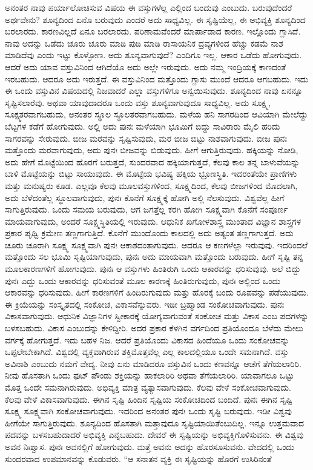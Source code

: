 ಅನಂತರ ನಾವು ಪರ್ಯಾಲೋಚಿಸುವ ವಿಷಯ ಈ ವಸ್ತುಗಳೆಲ್ಲ ಎಲ್ಲಿಂದ ಬಂದುವು ಎಂಬುದು. ಬರುವುದೆಂದರೆ ಅರ್ಥವೇನು? ಶೂನ್ಯದಿಂದ ಏನೊ ಬರುವುದು ಎಂದರೆ ಅದು ಸಾಧ್ಯವಿಲ್ಲ. ಈ ಸೃಷ್ಟಿಯೆಲ್ಲ, ಈ ಅಭಿವ್ಯಕ್ತಿ ಶೂನ್ಯದಿಂದ ಬರಲಾರದು. ಕಾರಣವಿಲ್ಲದೆ ಏನೂ ಬರಲಾರದು. ಪರಿಣಾಮವೆಂದರೆ ಮಾರ್ಪಾಡಾದ ಕಾರಣ. ಇಲ್ಲೊಂದು ಗ್ಲಾಸಿದೆ. ನಾವು ಅದನ್ನು ಒಡೆದು ಚೂರು ಚೂರು ಮಾಡಿ ಪುಡಿ ಮಾಡಿ ರಾಸಾಯನಿಕ ದ್ರವ್ಯಗಳಿಂದ ಹೆಚ್ಚು ಕಡಮೆ ನಾಶ ಮಾಡಿದೆವು ಎಂದು ಇಟ್ಟು ಕೊಳ್ಳೋಣ. ಅದು ಶೂನ್ಯವಾಗುವುದೆ? ಎಂದಿಗೂ ಇಲ್ಲ. ಆಕಾರ ಒಡೆದು ಹೋಗುವುದು. ಆದರೆ ಅದು ಯಾವ ವಸ್ತುವಿನಿಂದ ಆಗಿದೆಯೊ ಅದು ಅಲ್ಲೇ ಇರುವುದು. ಅದು ನಮ್ಮ ಇಂದ್ರಿಯಕ್ಕೆ ಕಾಣದಂತೆ ಇರಬಹುದು. ಆದರೂ ಅದು ಇರುತ್ತದೆ. ಈ ವಸ್ತುವಿನಿಂದ ಮತ್ತೊಂದು ಗ್ಲಾಸು ಮುಂದೆ ಆದರೂ ಆಗಬಹುದು. ಇದು ಈ ಒಂದು ವಸ್ತುವಿನ ವಿಷಯದಲ್ಲಿ ನಿಜವಾದರೆ ಎಲ್ಲಾ ವಸ್ತುಗಳಿಗೂ ಅನ್ವಯಿಸುವುದು. ಶೂನ್ಯದಿಂದ ನಾವು ಏನನ್ನೂ ಸೃಷ್ಟಿಸಲಾರೆವು. ಅಥವಾ ಯಾವುದಾದರೂ ಒಂದು ವಸ್ತು ಶೂನ್ಯವಾಗುವುದೂ ಸಾಧ್ಯವಿಲ್ಲ. ಅದು ಸೂಕ್ಷ್ಮ, ಸೂಕ್ಷ್ಮತರವಾಗಬಹುದು, ಅನಂತರ ಸ್ಥೂಲ ಸ್ಥೂಲತರವಾಗಬಹುದು. ಮಳೆಯ ಹನಿ ಸಾಗರದಿಂದ ಆವಿಯಾಗಿ ಮೇಲೆದ್ದು ಬೆಟ್ಟಗಳ ಕಡೆಗೆ ಹೋಗುವುದು. ಅಲ್ಲಿ ಅದು ಪುನಃ ಮಳೆಯಾಗಿ ಭೂಮಿಗೆ ಬಿದ್ದು ಸಾವಿರಾರು ಮೈಲಿ ಹರಿದು ಸಾಗರವನ್ನು ಸೇರುವುದು. ಬೀಜ ಮರವನ್ನು ಸೃಷ್ಟಿಸುವುದು, ಮರ ಬೀಜ ಬಿಟ್ಟು ನಾಶವಾಗುವುದು. ಬೀಜ ಪುನಃ ಮತ್ತೊಂದು ಮರವಾಗುವುದು, ಅದು ಪುನಃ ಬೀಜವನ್ನು ಬಿಡುವುದು. ಹೀಗೆ ಆಗುತ್ತಿರುವುದು. ಹಕ್ಕಿಯನ್ನು ನೋಡಿ, ಅದು ಹೇಗೆ ಮೊಟ್ಟೆಯಿಂದ ಹೊರಗೆ ಬರುತ್ತದೆ, ಸುಂದರವಾದ ಹಕ್ಕಿಯಾಗುತ್ತದೆ, ಕೆಲವು ಕಾಲ ತನ್ನ ಬಾಳುವೆಯನ್ನು ಬಾಳಿ ಮೊಟ್ಟೆಯನ್ನು ಬಿಟ್ಟು ಸಾಯುವುದು. ಈ ಮೊಟ್ಟೆಯ ಭವಿಷ್ಯ ಹಕ್ಕಿಯ ಭ್ರೂಣಸ್ಥಿತಿ. ಇದರಂತೆಯೇ ಪ್ರಾಣಿಗಳು ಮತ್ತು ಮನುಷ್ಯರು ಕೂಡ. ಎಲ್ಲವೂ ಕೆಲವು ಮೂಲವಸ್ತುಗಳಿಂದ, ಸೂಕ್ಷ್ಮದಿಂದ, ಕೆಲವು ಬೀಜಗಳಿಂದ ಮೊದಲಾಗಿ, ಅದು ಬೆಳೆದಂತೆಲ್ಲ ಸ್ಥೂಲವಾಗುವುದು, ಪುನಃ ಕೊನೆಗೆ ಸೂಕ್ಷ್ಮಕ್ಕೆ ಹೋಗಿ ಅಲ್ಲಿ ನೆಲಸುವುದು. ವಿಶ್ವವೆಲ್ಲ ಹೀಗೆ ಸಾಗುತ್ತಿರುವುದು. ಒಂದು ಸಮಯ ಬರುವುದು, ಆಗ ಜಗತ್ತೆಲ್ಲ ಕರಗಿ ಹೋಗಿ ಸೂಕ್ಷ್ಮವಾಗಿ ಕೊನೆಗೆ ಸಂಪೂರ್ಣ ಮಾಯವಾಗುವುದು, ಅಂದರೆ ಸೂಕ್ಷ್ಮಸ್ಥಿತಿಯಲ್ಲಿ ಇರುವುದು. ಆಧುನಿಕ ಖಗೋಳಶಾಸ್ತ್ರ ಮುಂತಾದ ವಿಜ್ಞಾನ ಶಾಸ್ತ್ರಗಳ ಪ್ರಕಾರ ಪೃಥ್ವಿ ಕ್ರಮೇಣ ತಣ್ಣಗಾಗುತ್ತಿದೆ. ಕೊನೆಗೆ ಮುಂದೊಂದು ಕಾಲದಲ್ಲಿ ಅದು ಅತ್ಯಂತ ತಣ್ಣಗಾಗುತ್ತದೆ. ಅದು ಚೂರು ಚೂರಾಗಿ ಸೂಕ್ಷ್ಮ ಸೂಕ್ಷ್ಮವಾಗಿ ಪುನಃ ಆಕಾಶದಂತಾಗುವುದು. ಆದರೂ ಆ ಕಣಗಳೆಲ್ಲಾ ಇರುವುವು. ಇದರಿಂದಲೆ ಮತ್ತೊಂದು ಸಲ ಭೂಮಿ ಸೃಷ್ಟಿಯಾಗುವುದು, ಪುನಃ ಅದು ಮಾಯವಾಗಿ ಮತ್ತೊಂದು ಬರುವುದು. ಹೀಗೆ ಸೃಷ್ಟಿ ತನ್ನ ಮೂಲಕಾರಣಗಳಿಗೆ ಹೋಗುವುದು. ಪುನಃ ಆ ವಸ್ತುಗಳು ಹಿಂತಿರುಗಿ ಒಂದು ಆಕಾರವನ್ನು ಧರಿಸುವುವು. ಅಲೆ ಬಿದ್ದು ಪುನಃ ಎದ್ದು ಒಂದು ಆಕಾರವನ್ನು ಧರಿಸುವಂತೆ ಮೂಲ ಕಾರಣಕ್ಕೆ ಹಿಂತಿರುಗುವುದು, ಪುನಃ ಅಲ್ಲಿಂದ ಒಂದು ಆಕಾರವನ್ನು ಧರಿಸುವುದು. ಹೀಗೆ ಕಾರಣಗಳಿಗೆ ಹಿಂದಿರುಗುವುದು ಮತ್ತು ಹೊರಕ್ಕೆ ಬಂದು ರೂಪವನ್ನು ಪಡೆಯುವುದು. ಈ ಕ್ರಿಯೆಯನ್ನು ಸಂಸ್ಕೃತದಲ್ಲಿ ಸಂಕೋಚ, ವಿಕಾಸವೆನ್ನುವರು. ಇಡೀ ಬ್ರಹ್ಮಾಂಡ ಸಂಕೋಚವಾಗುವುದು. ಪುನಃ ವಿಕಾಸವಾಗುವುದು. ಆಧುನಿಕ ವಿಜ್ಞಾನಿಗಳ ಸ್ವೀಕಾರಕ್ಕೆ ಯೋಗ್ಯವಾಗುವಂತೆ ಸಂಕೋಚ ಮತ್ತು ವಿಕಾಸ ಎಂಬ ಪದಗಳನ್ನು ಬಳಸಬಹುದು. ವಿಕಾಸ ಎಂಬುದನ್ನು ಕೇಳಿದ್ದೀರಿ. ಅದರ ಪ್ರಕಾರ ಕೆಳಗಿನ ವರ್ಗದಿಂದ ಪ್ರತಿಯೊಂದೂ ಬೆಳೆದು ಮೇಲು ವರ್ಗಕ್ಕೆ ಹೋಗುತ್ತದೆ. ಇದು ಬಹಳ ನಿಜ. ಆದರೆ ಪ್ರತಿಯೊಂದು ವಿಕಾಸದ ಹಿಂದೆಯೂ ಒಂದು ಸಂಕೋಚವನ್ನು ಒಪ್ಪಲೇಬೇಕಾಗಿದೆ. ವಿಶ್ವದಲ್ಲಿ ವ್ಯಕ್ತವಾಗಿರುವ ಶಕ್ತಿಮೊತ್ತವೆಲ್ಲ ಎಲ್ಲ ಕಾಲದಲ್ಲಿಯೂ ಒಂದೇ ಸಮನಾಗಿದೆ. ವಸ್ತು ಅವಿನಾಶಿ ಎಂಬುದು ನಮಗೆ ವೇದ್ಯ. ನೀವು ಏನು ಮಾಡಿದರೂ ವಸ್ತುವಿನ ಒಂದು ಕಣವನ್ನೂ ಆಚೆಗೆ ತೆಗೆಯಲಾರಿರಿ. ನೀವು ಹೊಸತಾಗಿ ಒಂದು ಫುಟ್ ಪೌಂಡು ಶಕ್ತಿಯನ್ನು ಹಾಕಲಾರಿರಿ ಅಥವಾ ತೆಗೆಯಲಾರಿರಿ. ಯಾವಾಗಲೂ ಒಟ್ಟು ಮೊತ್ತ ಒಂದೇ ಸಮನಾಗಿರುವುದು. ಅಭಿವ್ಯಕ್ತಿ ಮಾತ್ರ ವ್ಯತ್ಯಾಸವಾಗುವುದು. ಕೆಲವು ವೇಳೆ ಸಂಕೋಚವಾಗುವುದು. ಕೆಲವು ವೇಳೆ ವಿಕಾಸವಾಗುವುದು. ಈಗಿನ ಸೃಷ್ಟಿ ಹಿಂದಿನ ಸೃಷ್ಟಿಯ ಸಂಕೋಚದಿಂದ ಬಂದಿದೆ. ಪುನಃ ಈಗಿನ ಸೃಷ್ಟಿ ಸೂಕ್ಷ್ಮ ಸೂಕ್ಷ್ಮವಾಗಿ ಸಂಕೋಚವಾಗುವುದು. ಇದರಿಂದ ಅನಂತರ ಪುನಃ ಒಂದು ಸೃಷ್ಟಿ ಬರುವುದು. ಇಡೀ ವಿಶ್ವವು ಹೀಗೆಯೇ ಸಾಗುತ್ತಿರುವುದು. ಶೂನ್ಯದಿಂದ ಹೊಸತಾಗಿ ಮತ್ತಾವುದೂ ಸೃಷ್ಟಿಯಾಯಿತೆಂಬುದಿಲ್ಲ. ಇನ್ನೂ ಉತ್ತಮವಾದ ಪದವನ್ನು ಬಳಸಬಹುದಾದರೆ ಅಭಿವ್ಯಕ್ತಿ ಎನ್ನಬಹುದು. ದೇವರೆ ಈ ಸೃಷ್ಟಿಯನ್ನು ಅಭಿವ್ಯಕ್ತಿಗೊಳಿಸುವನು. ಈ ವಿಶ್ವವು ಅವನ ನಿಃಶ್ವಾಸ. ಪುನಃ ಅವನಲ್ಲಿಗೆ ಹೋಗುವುದು. ಮತ್ತೆ ಅವನು ಅದನ್ನು ಹೊರಸೂಸುವನು. ವೇದದಲ್ಲಿ ಒಂದು ಸುಂದರವಾದ ಉಪಮಾನವನ್ನು ಕೊಡುವರು. ``ಆ ಸನಾತನ ವ್ಯಕ್ತಿ ಈ ಸೃಷ್ಟಿಯನ್ನು ಹೊರಗೆ ಉಸಿರಿನಂತೆ 